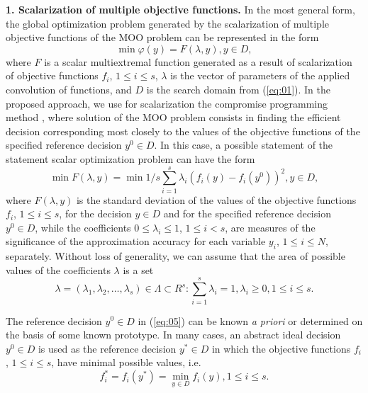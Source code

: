 \documentclass[runningheads]{llncs}
\begin{document}
\textbf{1. Scalarization of multiple objective functions.} In the most general form, the global optimization problem generated by the scalarization of multiple objective functions of the MOO problem can be represented in the form
\begin{equation}
\label{eq:04}
\min {\varphi(y)} = F(\lambda, y), y \in D,
\end{equation}
where $F$ is a scalar multiextremal function generated as a result of scalarization of objective functions $f_i$, $1 \leq i \leq s$, $\lambda$ is the vector of parameters of the applied convolution of functions, and $D$ is the search domain from (\ref{eq:01}). In the proposed approach, we use for scalarization the compromise programming method \cite{c2,c11}, where solution of the MOO problem consists in finding the efficient decision corresponding most closely to the values of the objective functions of the specified reference decision $y^0 \in D$. In this case, a possible statement of the statement scalar optimization problem can have the form 
\begin{equation}
\label{eq:05}
\min F(\lambda,y)=\min 1/s \sum_{i=1}^s {\lambda_i (f_i (y)-f_i (y^0 ))^2}, y \in D,
\end{equation}
where $F(\lambda,y)$ is the standard deviation of the values of the objective functions $f_i$, $1 \leq i \leq s$, for the decision $y \in D$ and for the specified reference decision $y^0 \in D$, while the coefficients $0 \leq \lambda_i \leq 1$, $1 \leq i < s$, are measures of the significance of the approximation accuracy for each variable $y_i$, $1 \leq i \leq N$, separately. Without loss of generality, we can assume that the area of possible values of the coefficients $\lambda$ is a set 
\begin{equation}
\label{eq:06}
\lambda=(\lambda_1,\lambda_2, \dots, \lambda_s)\in \Lambda \subset R^s: \sum_{i=1}^{s}\lambda_i=1, \lambda_i \geq 0, 1 \leq i \leq s.
\end{equation}

The reference decision $y^0 \in D$ in (\ref{eq:05}) can be known \textit{a priori} or determined on the basis of some known prototype. In many cases, an abstract ideal decision $y^0 \in D$ is used as the reference decision $y^*\in D$ in which the objective functions $f_i$, $1 \leq i \leq s$, have minimal possible values, i.e.
\begin{equation}
\label{eq:07}
f_i^* =f_i (y^*)=\min_{y \in D} f_i (y), 1 \leq i \leq s.
\end{equation}
\end{document}
